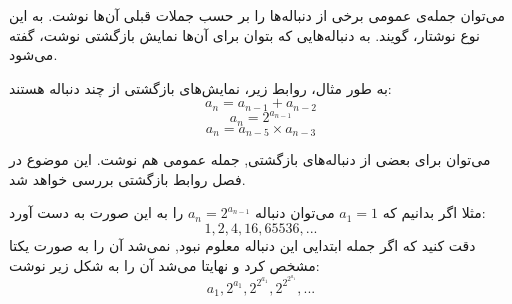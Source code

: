 
\begin{DEFINITION}
    \p
    می‌توان جمله‌ی عمومی برخی از دنباله‌ها را بر حسب جملات قبلی آن‌ها نوشت.
    به این نوع نوشتار،
    گویند.
    به دنباله‌هایی که بتوان برای آن‌ها نمایش بازگشتی نوشت،
    گفته می‌شود.
\end{DEFINITION}

به طور مثال، روابط زیر، نمایش‌های بازگشتی از چند دنباله هستند:
$$a_n=a_{n-1}+a_{n-2}$$
$$a_n=2^{a_{n-1}}$$
$$a_n=a_{n-5}\times a_{n-3}$$

می‌توان برای بعضی از دنباله‌های بازگشتی, جمله عمومی هم نوشت. این موضوع در فصل روابط بازگشتی بررسی خواهد شد.

\p
مثلا اگر بدانیم که 
$a_1=1$
می‌توان دنباله
$a_n=2^{a_{n-1}}$
را به این صورت به دست آورد:
\[1,2,4,16,65536,...\]
دقت کنید که اگر جمله ابتدایی این دنباله معلوم نبود, نمی‌شد آن را به صورت یکتا مشخص کرد و نهایتا می‌شد آن را به شکل زیر نوشت:
\[a_1,2^{a_1},2^{2^{a_1}},2^{2^{2^{a_1}}},...\]








